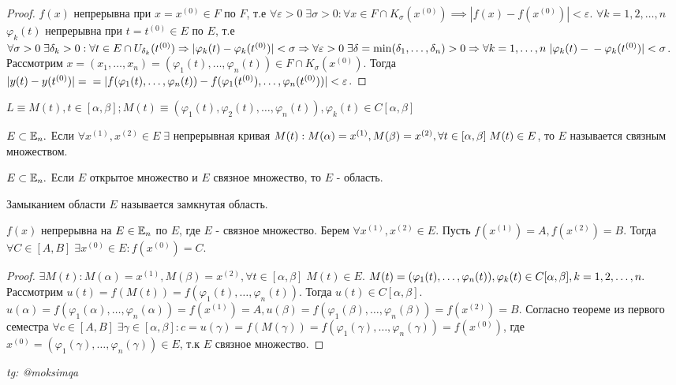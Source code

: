 \documentclass[../main.tex]{subfiles}
\begin{document}
\begin{proof}
    $f(x)$ непрерывна при $x=x^{(0)}\in F$ по $F$, т.е $ \forall \varepsilon>0 \; \exists \sigma>0 : \forall x \in F\cap K_{\sigma}(x^{(0)})\implies |f(x)-f(x^{(0)})|<\varepsilon$. $\forall k = 1,2,\dots,n$ $\varphi_{k}(t)$ непрерывна при $t=t^{(0)}\in E$ по $E$, т.е $\forall \sigma>0 \; \exists \delta_{k}>0 : \\\forall t \in E \cap  U_{\delta_{k}}(t^{(0)})\implies  |\varphi_{k}(t)-\varphi_{k}(t^{(0)})|<\sigma\implies \forall \varepsilon>0 \; \exists \delta = \min(\delta_{1},\dots,\delta_{n})>0\implies \forall k=1,\dots,n \; |\varphi_{k}(t)-\\-\varphi_{k}(t^{(0)})|<\sigma$. Рассмотрим $x=(x_{1},\dots,x_{n})= (\varphi_{1}(t),\dots,\varphi_{n}(t))\in F\cap K_{\sigma}(x^{(0)})$. Тогда $|y(t)-y(t^{(0)})|=\\=|f(\varphi_{1}(t), \dots,\varphi_{n}(t)) - f(\varphi_{1}(t^{(0)}),\dots,\varphi_{n}(t^{(0)}))|<\varepsilon$. 
\end{proof}
$L \equiv M(t) , t\in [\alpha,\beta]; M(t)\equiv (\varphi_{1}(t),\varphi_{2}(t),\dots,\varphi_{n}(t)), \varphi_{k}(t) \in C[\alpha,\beta]$  
\begin{definition}
    $E\subset \E_{n}.$ Если $\forall x^{(1)},x^{(2)} \in E \; \exists $ непрерывная кривая $M(t): M(\alpha) = x^{(1)}, M(\beta) = x^{(2)},\\ \forall t \in [\alpha,\beta] \; M(t)\in E$, то $E$ называется связным множеством.     
\end{definition}
\begin{definition}
    $E \subset \E_{n}.$ Если $E$ открытое множество и $E$ связное множество, то $E$ - область.
\end{definition}
\begin{definition}
    Замыканием области $E$ называется замкнутая область.
\end{definition}
\begin{theorem}
    $f(x)$ непрерывна на $E\in \E_{n}$ по $E$, где $E$ - связное множество. Берем $\forall x^{(1)},x^{(2)}\in E.$ Пусть $f(x^{(1)})=A, f(x^{(2)})=B$. Тогда $\forall C \in [A,B] \; \exists x^{(0)} \in E : f(x^{(0)})=C$.
\end{theorem}
\begin{proof}
    $\exists M(t) : M(\alpha) = x^{(1)}, M(\beta) = x^{(2)}, \forall t \in [\alpha,\beta] \; M(t)\in E$. $M(t)=(\varphi_{1}(t) , \dots , \varphi_{n}(t)), \\\varphi_{k}(t)\in C[\alpha,\beta], k=1,2,\dots,n.$
    Рассмотрим $u(t) = f( M(t)) = f(  \varphi_{1}(t),\dots,\varphi_{n}(t))$. Тогда $u(t)\in C[\alpha,\beta]$. $u(\alpha) = f(\varphi_{1}(\alpha),\dots,\varphi_{n}(\alpha))=f(x^{(1)})=A, u(\beta) = f(\varphi_{1}(\beta),\dots,\varphi_{n}(\beta))=f(x^{(2)})=B$. Согласно теореме из первого семестра $\forall c\in [A,B] \; \exists \gamma \in [\alpha,\beta] : c = u(\gamma) =f(M(\gamma)) =f(\varphi_{1}(\gamma),\dots,\varphi_{n}(\gamma))=f(x^{(0)})$, где $x^{(0)} = (\varphi_{1}(\gamma),\dots,\varphi_{n}(\gamma))\in E$, т.к $E$ связное множество. 
\end{proof}


\vspace{1cm}
\begin{flushright}
    \textit{tg: @moksimqa}
\end{flushright}
\end{document}
